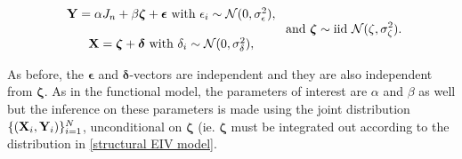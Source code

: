 \documentclass{homework}
\begin{document}
\begin{equation}
    \begin{array}{c}
         {\bf Y} = \alpha J_n + \beta \bm{\zeta} + \bm{\epsilon}  \textnormal{ with } \epsilon_i \sim \mathcal{N}(0, \sigma^2_\epsilon), \\
         \\
         {\bf X} = \bm{\zeta} + \bm{\delta} \textnormal{ with } \delta_i \sim \mathcal{N}(0, \sigma^2_\delta),
    \end{array} \textnormal{ and } \bm{\zeta} \sim \textnormal{iid } \mathcal{N}(\zeta, \sigma_\zeta^2).
    \label{structural EIV model}
\end{equation}

As before, the $\bm{\epsilon}$ and $\bm{\delta}$-vectors are independent and they are also independent from $\bm{\zeta}$. As in the functional model, the parameters of interest are $\alpha$ and $\beta$ as well but the inference on these parameters is made using the joint distribution $\{({\bf X}_i, {\bf Y}_i)\}_{i=1}^{N}$, unconditional on $\bm{\zeta}$ (ie. $\bm{\zeta}$ must be integrated out according to the  distribution in \eqref{structural EIV model}. 
\end{document}
